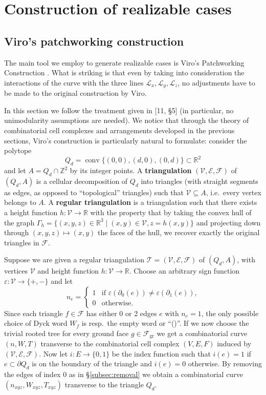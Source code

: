 \documentclass[11pt,reqno]{amsart}
\theoremstyle{plain}
\theoremstyle{definition}
\theoremstyle{remark}
\numberwithin{equation}{subsection}
\newcommand*{\bbR}{\mathbb{R}}
\newcommand*{\bbZ}{\mathbb{Z}}
\newcommand*{\calE}{\mathcal{E}}
\newcommand*{\calF}{\mathcal{F}}
\newcommand*{\calL}{\mathcal{L}}
\newcommand*{\calT}{\mathcal{T}}
\newcommand*{\calV}{\mathcal{V}}
\DeclareMathOperator{\gr}{gr}
\DeclareMathOperator{\conv}{conv}
\begin{document}
\section{Construction of realizable cases}\label{sec:constructions}

\subsection{Viro's patchworking construction}\label{subsec:viro}

The main tool we employ to generate realizable cases is Viro's Patchworking Construction \cite{viro2006patchworking}. What is striking is that even by taking into consideration the interactions of the curve with the three lines $\calL_x,\calL_y,\calL_z$, no adjustments have to be made to the original construction by Viro.

In this section we follow the treatment given in \cite{gelfand1994discriminants}[11, §5] (in particular, no unimodularity assumptions are needed). We notice that through the theory of combinatorial cell complexes and arrangements developed in the previous sections, Viro's construction is particularly natural to formulate: consider the polytope
\[Q_d=\conv\{(0,0),(d,0),(0,d)\}\subset\bbR^2\]
and let $A=Q_d\cap\bbZ^2$ by its integer points. A \textbf{triangulation} $(\calV,\calE,\calF)$ of $(Q_d,A)$ is a cellular decomposition of $Q_d$ into triangles (with straight segments as edges, as opposed to ``topological'' triangles) such that $\calV\subseteq A$, i.e.\ every vertex belongs to $A$. A \textbf{regular triangulation} is a triangulation such that there exists a height function $h\colon\calV\to\bbR$ with the property that by taking the convex hull of the graph $\Gamma_h=\{(x,y,z)\in\bbR^3\mid(x,y)\in\calV,z=h(x,y)\}$ and projecting down through $(x,y,z)\mapsto(x,y)$ the faces of the hull, we recover exactly the original triangles in $\calF$.

Suppose we are given a regular triangulation $\calT=(\calV,\calE,\calF)$ of $(Q_d,A)$, with vertices $\calV$ and height function $h\colon\calV\to\bbR$. Choose an arbitrary sign function $\varepsilon\colon\calV\to\{+,-\}$ and let
\[n_e=\begin{cases}1&\text{if $\varepsilon(\partial_0(e))\neq\varepsilon(\partial_1(e))$,}\\0&\text{otherwise}.\end{cases}\]
Since each triangle $f\in\calF$ has either 0 or 2 edges $e$ with $n_e=1$, the only possible choice of Dyck word $W_f$ is resp.\ the empty word or ``()''. If we now choose the trivial rooted tree for every ground face $g\in\calF_{\gr}$ we get a combinatorial curve $(n,W,T)$ transverse to the combinatorial cell complex $(V,E,F)$ induced by $(\calV,\calE,\calF)$. Now let $i\colon E\to\{0,1\}$ be the index function such that $i(e)=1$ if $e\subset\partial Q_d$ is on the boundary of the triangle and $i(e)=0$ otherwise. By removing the edges of index 0 as in §\ref{subsec:removal} we obtain a combinatorial curve $(n_{xyz},W_{xyz},T_{xyz})$ transverse to the triangle $Q_d$.
\end{document}
